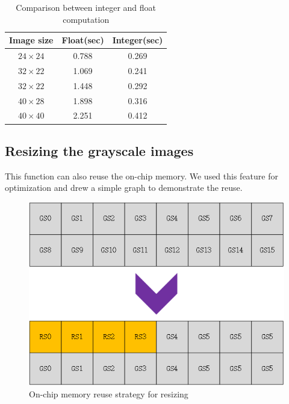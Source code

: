 \documentclass[conference]{IEEEtran}
\begin{document}
\begin{table}
	\centering
	\caption{Comparison between integer and float computation}
	\label{tab:Compare}
	\begin{tabular}{ccc}
		\toprule
		Image size& Float(sec)& Integer(sec)\\
		\midrule
		$24\times24$& 0.788& 0.269\\
		$32\times22$& 1.069& 0.241\\
		$32\times22$& 1.448& 0.292\\
		$40\times28$& 1.898& 0.316\\
		$40\times40$& 2.251& 0.412\\
		\bottomrule
	\end{tabular}
\end{table}
\subsection{Resizing the grayscale images}
This function can also reuse the on-chip memory. We used this feature for optimization and drew a simple graph to demonstrate the reuse.
\begin{figure}
	\centering
	\includegraphics[scale=0.5]{resize.png}
	\caption{On-chip memory reuse strategy for resizing}
	\label{fg:resize}
\end{figure}
\end{document}
